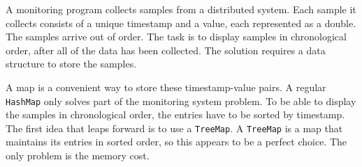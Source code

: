 







 \begin{example}
   A monitoring program collects samples from a distributed
   system. Each sample it collects consists of a unique timestamp and a
   value, each represented as a double. The samples arrive out of
   order. The task is to display samples in chronological order, after
   all of the data has been collected. The solution requires a data
   structure to store the samples. 
\end{example}


A map is a convenient way to store these timestamp-value pairs. A regular \texttt{HashMap} only solves part of the monitoring system problem. To be able to display the samples in chronological order, the entries have to be sorted by timestamp. 
The first idea that leaps forward is to use a \texttt{TreeMap}. A \texttt{TreeMap} is a map that maintains its entries in sorted order, so this appears to be a perfect choice. The only problem is the memory cost.

